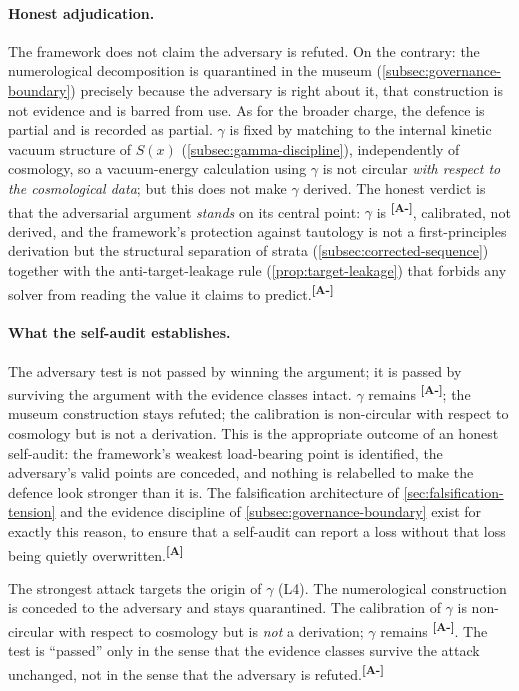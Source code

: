 \documentclass[12pt,a4paper,twoside]{article}
\theoremstyle{plain}
\theoremstyle{definition}
\theoremstyle{remark}
\newcommand{\catmark}[1]{\textsuperscript{\textsf{\textbf{[#1]}}}}
\newcommand{\Sx}{S(x)}
\begin{document}
\paragraph{Honest adjudication.}
The framework does not claim the adversary is refuted. On the contrary: the numerological decomposition is quarantined in the museum (\cref{subsec:governance-boundary}) precisely because the adversary is right about it, that construction is not evidence and is barred from use. As for the broader charge, the defence is partial and is recorded as partial. $\gamma$ is fixed by matching to the internal kinetic vacuum structure of $\Sx$ (\cref{subsec:gamma-discipline}), independently of cosmology, so a vacuum-energy calculation using $\gamma$ is not circular \emph{with respect to the cosmological data}; but this does not make $\gamma$ derived. The honest verdict is that the adversarial argument \emph{stands} on its central point: $\gamma$ is \catmark{A-}, calibrated, not derived, and the framework's protection against tautology is not a first-principles derivation but the structural separation of strata (\cref{subsec:corrected-sequence}) together with the anti-target-leakage rule (\cref{prop:target-leakage}) that forbids any solver from reading the value it claims to predict.\catmark{A-}

\paragraph{What the self-audit establishes.}
The adversary test is not passed by winning the argument; it is passed by surviving the argument with the evidence classes intact. $\gamma$ remains \catmark{A-}; the museum construction stays refuted; the calibration is non-circular with respect to cosmology but is not a derivation. This is the appropriate outcome of an honest self-audit: the framework's weakest load-bearing point is identified, the adversary's valid points are conceded, and nothing is relabelled to make the defence look stronger than it is. The falsification architecture of \cref{sec:falsification-tension} and the evidence discipline of \cref{subsec:governance-boundary} exist for exactly this reason, to ensure that a self-audit can report a loss without that loss being quietly overwritten.\catmark{A}

\begin{governancebox}
The strongest attack targets the origin of $\gamma$ (L4). The numerological construction is conceded to the adversary and stays quarantined. The calibration of $\gamma$ is non-circular with respect to cosmology but is \emph{not} a derivation; $\gamma$ remains \catmark{A-}. The test is ``passed'' only in the sense that the evidence classes survive the attack unchanged, not in the sense that the adversary is refuted.\catmark{A-}
\end{governancebox}
\end{document}
